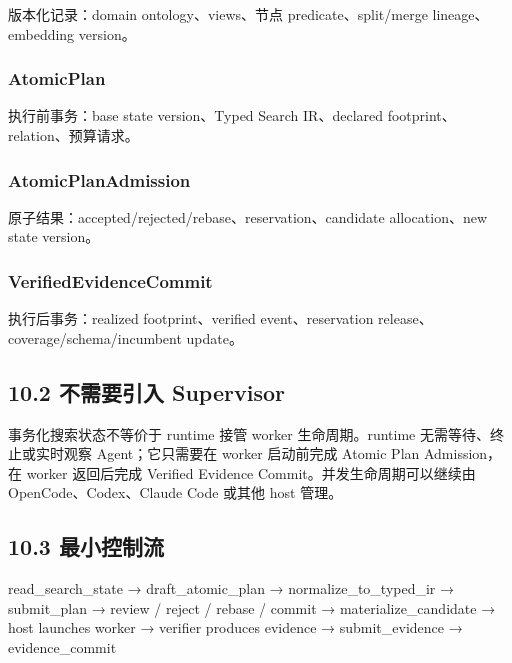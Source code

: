 \documentclass[
  11pt]{ctexart}
\newenvironment{Shaded}{}{}
\newcommand{\NormalTok}[1]{#1}
\begin{document}
版本化记录：domain ontology、views、节点 predicate、split/merge
lineage、embedding version。

\subsubsection{AtomicPlan}\label{atomicplan}

执行前事务：base state version、Typed Search IR、declared
footprint、relation、预算请求。

\subsubsection{AtomicPlanAdmission}\label{atomicplanadmission}

原子结果：accepted/rejected/rebase、reservation、candidate
allocation、new state version。

\subsubsection{VerifiedEvidenceCommit}\label{verifiedevidencecommit}

执行后事务：realized footprint、verified event、reservation
release、coverage/schema/incumbent update。

\subsection{10.2 不需要引入
Supervisor}\label{ux4e0dux9700ux8981ux5f15ux5165-supervisor}

事务化搜索状态不等价于 runtime 接管 worker 生命周期。runtime
无需等待、终止或实时观察 Agent；它只需要在 worker 启动前完成 Atomic Plan
Admission，在 worker 返回后完成 Verified Evidence
Commit。并发生命周期可以继续由 OpenCode、Codex、Claude Code 或其他 host
管理。

\subsection{10.3 最小控制流}\label{ux6700ux5c0fux63a7ux5236ux6d41}

\begin{Shaded}
\begin{Highlighting}[]
\NormalTok{read\_search\_state}
\NormalTok{→ draft\_atomic\_plan}
\NormalTok{→ normalize\_to\_typed\_ir}
\NormalTok{→ submit\_plan}
\NormalTok{→ review / reject / rebase / commit}
\NormalTok{→ materialize\_candidate}
\NormalTok{→ host launches worker}
\NormalTok{→ verifier produces evidence}
\NormalTok{→ submit\_evidence}
\NormalTok{→ evidence\_commit}
\end{Highlighting}
\end{Shaded}
\end{document}
